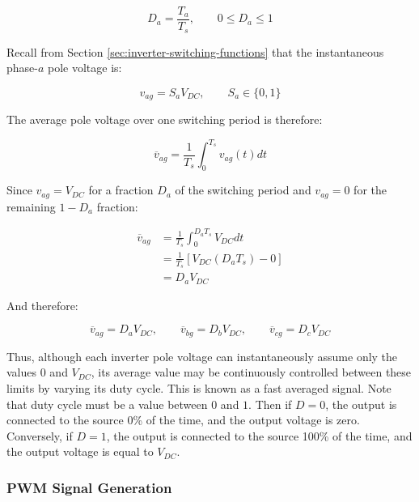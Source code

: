 \documentclass{article}
\begin{document}
\begin{equation}
    D_a = \frac{T_a}{T_s}, \qquad
    0 \leq D_a \leq 1
\end{equation}

Recall from Section \ref{sec:inverter-switching-functions} that the instantaneous phase-$a$ pole voltage is:

\begin{equation}
    v_{ag} = S_aV_{DC}, \qquad
    S_a \in \{0, 1\}
\end{equation}

The average pole voltage over one switching period is therefore:

\begin{equation}
    \overline{v}_{ag} = \frac{1}{T_s}\int_0^{T_s} v_{ag}(t)dt
\end{equation}

Since $v_{ag} = V_{DC}$ for a fraction $D_a$ of the switching period and $v_{ag} = 0$ for the remaining $1 - D_a$ fraction:

\begin{align}
    \overline{v}_{ag} 
    &= \frac{1}{T_s}\int_0^{D_aT_s} V_{DC}dt \\[4pt]
    &= \frac{1}{T_s}[V_{DC}(D_aT_s) - 0] \\[4pt]
    &= D_aV_{DC}
\label{eqn:average-voltage}
\end{align}

And therefore:

\begin{equation}
    \overline{v}_{ag} = D_aV_{DC}, \qquad
    \overline{v}_{bg} = D_bV_{DC}, \qquad
    \overline{v}_{cg} = D_cV_{DC}
\end{equation}

Thus, although each inverter pole voltage can instantaneously assume only the values $0$ and $V_{DC}$, its average value may be continuously controlled between these limits by varying its duty cycle. This is known as a fast averaged signal. Note that duty cycle must be a value between $0$ and $1$. Then if $D = 0$, the output is connected to the source 0\% of the time, and the output voltage is zero. Conversely, if $D = 1$, the output is connected to the source 100\% of the time, and the output voltage is equal to $V_{DC}$.


\subsubsection{PWM Signal Generation}
\end{document}
